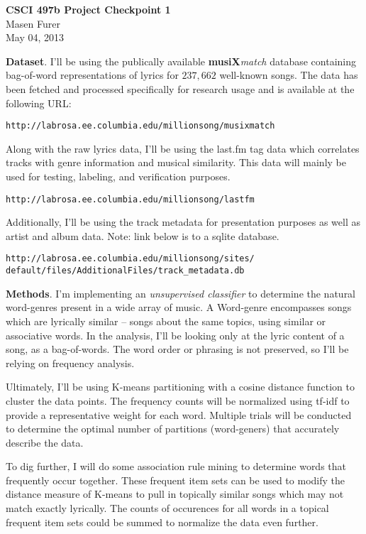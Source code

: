 \documentclass[11pt]{article}
\begin{document}
\begin{center}
\textbf{CSCI 497b Project Checkpoint 1} \\
Masen Furer\\
May 04, 2013\\
\end{center}

\textbf{Dataset}. I'll be using the publically available \textbf{musiX}\emph{match} 
database containing bag-of-word representations of lyrics for $237,662$ well-known
songs. The data has been fetched and processed specifically for research usage and
is available at the following URL:

\verb|http://labrosa.ee.columbia.edu/millionsong/musixmatch|

Along with the raw lyrics data, I'll be using the last.fm tag data which correlates
tracks with genre information and musical similarity. This data will mainly be
used for testing, labeling, and verification purposes. 

\verb|http://labrosa.ee.columbia.edu/millionsong/lastfm|

Additionally, I'll be using the track metadata for presentation purposes as
well as artist and album data. Note: link below is to a sqlite database.

\begin{verbatim}http://labrosa.ee.columbia.edu/millionsong/sites/
default/files/AdditionalFiles/track_metadata.db\end{verbatim}

\textbf{Methods}. I'm implementing an \emph{unsupervised classifier} to determine
the natural word-genres present in a wide array of music. A Word-genre encompasses
songs which are lyrically similar -- songs about the same topics, using similar
or associative words. In the analysis, I'll be looking only at the lyric content
of a song, as a bag-of-words. The word order or phrasing is not preserved, so 
I'll be relying on frequency analysis.

Ultimately, I'll be using K-means partitioning with a cosine distance
function to cluster the data points. The frequency counts will be normalized
using tf-idf to provide a representative weight for each word. 
Multiple trials will be conducted to determine the optimal number 
of partitions (word-geners) that accurately describe the data. 

To dig further, I will do some association rule mining to determine words that
frequently occur together. These frequent item sets can be used to modify
the distance measure of K-means to pull in topically similar songs which
may not match exactly lyrically. The counts of occurences for all words in
a topical frequent item sets could be summed to normalize the data even
further.
\end{document}
